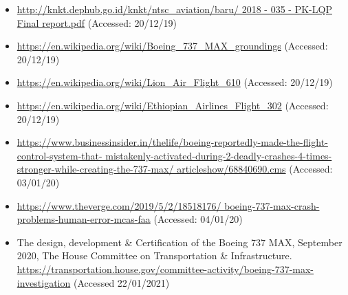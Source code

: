 \begin{itemize}
    \item \raggedright{\href{http://knkt.dephub.go.id/knkt/ntsc\_aviation/baru/2018\%20-\%20035\%20-\%20PK-LQP\%20Final\%20report.pdf}{http://knkt.dephub.go.id/knkt/ntsc\_aviation/baru/ 2018 - 035 - PK-LQP Final report.pdf} (Accessed: 20/12/19)}
    \item \raggedright{\href{https://en.wikipedia.org/wiki/Boeing\_737\_MAX\_groundings}{https://en.wikipedia.org/wiki/Boeing\_737\_MAX\_groundings} (Accessed: 20/12/19)}
    \item \raggedright{\href{https://en.wikipedia.org/wiki/Lion\_Air\_Flight\_610}{https://en.wikipedia.org/wiki/Lion\_Air\_Flight\_610} (Accessed: 20/12/19)}
    \item \raggedright{\href{https://en.wikipedia.org/wiki/Ethiopian\_Airlines\_Flight\_302}{https://en.wikipedia.org/wiki/Ethiopian\_Airlines\_Flight\_302}  (Accessed: 20/12/19)}
    \item \raggedright{\href{https://www.businessinsider.in/thelife/boeing-reportedly-made-the-flight-control-system-that-mistakenly-activated-during-2-deadly-crashes-4-times-stronger-while-creating-the-737-max/articleshow/68840690.cms}{https://www.businessinsider.in/thelife/boeing-reportedly-made-the-flight-control-system-that- mistakenly-activated-during-2-deadly-crashes-4-times-stronger-while-creating-the-737-max/ articleshow/68840690.cms} (Accessed: 03/01/20)}
    \item \raggedright{\href{https://www.theverge.com/2019/5/2/18518176/boeing-737-max-crash-problems-human-error-mcas-faa}{https://www.theverge.com/2019/5/2/18518176/ boeing-737-max-crash-problems-human-error-mcas-faa} (Accessed: 04/01/20)}
    \item The design, development \& Certification of the Boeing 737 MAX, September 2020, The House Committee on Transportation \& Infrastructure. \href{https://transportation.house.gov/committee-activity/boeing-737-max-investigation}{https://transportation.house.gov/committee-activity/boeing-737-max-investigation} (Accessed 22/01/2021)
\end{itemize}
%
%


